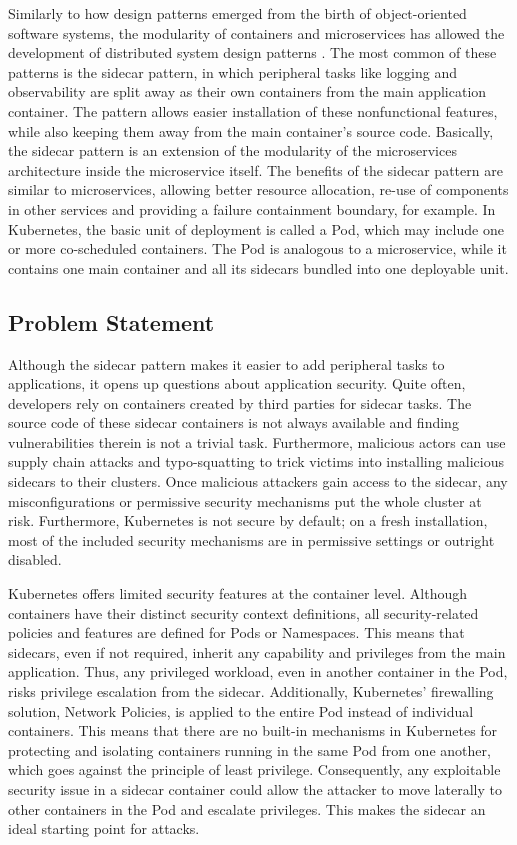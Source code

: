 \documentclass[english, 12pt, a4paper, sci, utf8, a-2b, online]{aaltothesis}
\begin{document}
Similarly to how design patterns emerged from the birth of object-oriented software systems, the modularity of containers and microservices has allowed the development of distributed system design patterns \cite{burns2016design}.
The most common of these patterns is the sidecar pattern, in which peripheral tasks like logging and observability are split away as their own containers from the main application container.
The pattern allows easier installation of these nonfunctional features, while also keeping them away from the main container's source code.
Basically, the sidecar pattern is an extension of the modularity of the microservices architecture inside the microservice itself.
The benefits of the sidecar pattern are similar to microservices, allowing better resource allocation, re-use of components in other services and providing a failure containment boundary, for example.
In Kubernetes, the basic unit of deployment is called a Pod, which may include one or more co-scheduled containers.
The Pod is analogous to a microservice, while it contains one main container and all its sidecars bundled into one deployable unit.

\subsection{Problem Statement}

Although the sidecar pattern makes it easier to add peripheral tasks to applications, it opens up questions about application security.
Quite often, developers rely on containers created by third parties for sidecar tasks.
The source code of these sidecar containers is not always available and finding vulnerabilities therein is not a trivial task.
Furthermore, malicious actors can use supply chain attacks and typo-squatting to trick victims into installing malicious sidecars to their clusters.
Once malicious attackers gain access to the sidecar, any misconfigurations or permissive security mechanisms put the whole cluster at risk.
Furthermore, Kubernetes is not secure by default; on a fresh installation, most of the included security mechanisms are in permissive settings or outright disabled.

Kubernetes offers limited security features at the container level.
Although containers have their distinct security context definitions, all security-related policies and features are defined for Pods or Namespaces.
This means that sidecars, even if not required, inherit any capability and privileges from the main application.
Thus, any privileged workload, even in another container in the Pod, risks privilege escalation from the sidecar.
Additionally, Kubernetes' firewalling solution, Network Policies, is applied to the entire Pod instead of individual containers.
This means that there are no built-in mechanisms in Kubernetes for protecting and isolating containers running in the same Pod from one another, which goes against the principle of least privilege.
Consequently, any exploitable security issue in a sidecar container could allow the attacker to move laterally to other containers in the Pod and escalate privileges.
This makes the sidecar an ideal starting point for attacks.
\end{document}
